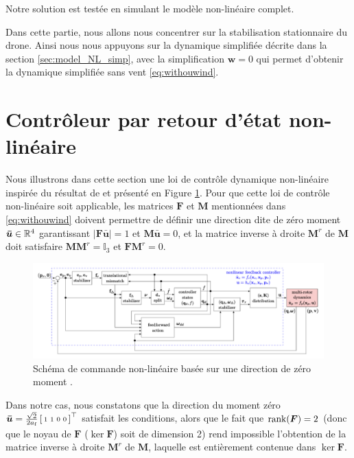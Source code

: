 Notre solution est testée en simulant le modèle non-linéaire complet.

Dans cette partie, nous allons nous concentrer sur la stabilisation stationnaire du drone. Ainsi nous nous appuyons sur la dynamique simplifiée décrite dans la section \ref{sec:model_NL_simp}, avec la simplification $\boldsymbol{w} = 0$ qui permet d'obtenir la dynamique simplifiée sans vent \eqref{eq:withouwind}. 



\section{Contrôleur par retour d'état non-linéaire}
Nous illustrons dans cette section une loi de contrôle dynamique non-linéaire inspirée du résultat de \cite{2020e-MicCenZacFra} et présenté en Figure \ref{fig:NLZeroMoment}. Pour que cette loi de contrôle non-linéaire soit applicable, les matrices $\boldsymbol{F}$ et $\boldsymbol{M}$ mentionnées dans \eqref{eq:withouwind} doivent permettre de définir une direction dite de zéro moment $\boldsymbol{\bar u} \in {\mathbb R}^4$ garantissant
$|\boldsymbol{F}\boldsymbol{\bar u}| = 1$ et $\boldsymbol{M} \boldsymbol{\bar u}=0$, et la matrice inverse à droite $\boldsymbol{M}^r$ de $\boldsymbol{M}$ doit satisfaire $\boldsymbol{M} \boldsymbol{M}^r = \mathbb{I}_3$ et $\boldsymbol{F}\boldsymbol{M}^r=0$. 

\begin{figure}[ht!]
  \centering
  \includegraphics[trim=0cm 0.6cm 0cm 0.6cm,clip,width=0.9\columnwidth]{figures/NLZeroMoment.png}
  \caption{Schéma de commande non-linéaire basée sur une direction de zéro moment \cite{2020e-MicCenZacFra}.}
  \label{fig:NLZeroMoment}
\end{figure}

Dans notre cas, nous constatons que la direction du moment zéro $\boldsymbol{\bar u} = \frac{\sqrt{2}}{2a_{\text{f}}}\left[ \begin{smallmatrix}1&1&0&0 \end{smallmatrix} \right]^\top$ satisfait les conditions, alors que le fait que $\operatorname{rank}(\boldsymbol{F}) = 2$ (donc que le noyau de $\boldsymbol{F}$ ($\ker \boldsymbol{F}$) soit de dimension 2) rend impossible l'obtention de la matrice inverse à droite $\boldsymbol{M}^r$ de $\boldsymbol{M}$, laquelle est entièrement contenue dans $\ker \boldsymbol{F}$.


